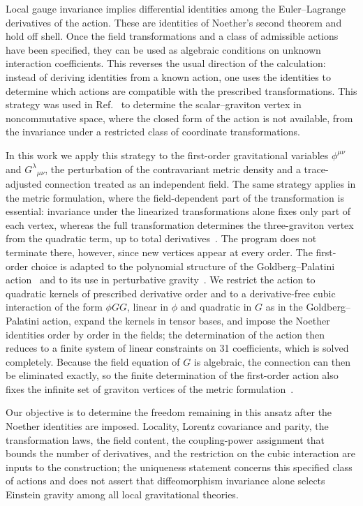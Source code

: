 \documentclass[prd,aps,preprint,nofootinbib,amsmath,amssymb,eqsecnum]{revtex4-2}
\begin{document}
Local gauge invariance implies differential identities among the Euler--Lagrange derivatives
of the action. These are identities of Noether's second theorem and hold off shell. Once the
field transformations and a class of admissible actions have been specified, they can be used
as algebraic conditions on unknown interaction coefficients. This reverses the usual direction
of the calculation: instead of deriving identities from a known action, one uses the
identities to determine which actions are compatible with the prescribed transformations.
This strategy was used in Ref.~\cite{BrandtElias2006} to determine the scalar--graviton
vertex in noncommutative space, where the closed form of the action is not available, from
the invariance under a restricted class of coordinate transformations.

In this work we apply this strategy to the first-order gravitational variables $\phi^{\mu\nu}$
and $G^{\lambda}{}_{\mu\nu}$, the perturbation of the contravariant metric density and a
trace-adjusted connection treated as an independent field. The
same strategy applies in the metric formulation, where the field-dependent part of the
transformation is essential: invariance under the linearized transformations alone fixes
only part of each vertex, whereas the full transformation determines the three-graviton
vertex from the quadratic term, up to total derivatives~\cite{BrandtFrenkel1996}. The
program does not terminate there, however, since new vertices appear at every order. The
first-order choice is adapted to the polynomial structure of the Goldberg--Palatini
action~\cite{Goldberg1958,Palatini1919,Ferraris1982} and to its use in perturbative
gravity~\cite{BrandtMcKeon2016}. We restrict the action to quadratic kernels of
prescribed derivative order and to a derivative-free cubic interaction of the form $\phi GG$, linear in $\phi$ and quadratic
in $G$ as in the Goldberg--Palatini action,
expand the kernels in tensor bases, and impose the Noether identities order by order in the
fields; the determination of the action then reduces to a finite system of linear constraints on 31
coefficients, which is solved completely. Because the field equation of $G$ is algebraic, the
connection can then be eliminated exactly, so the finite determination of the first-order
action also fixes the infinite set of graviton vertices of the metric
formulation~\cite{BrandtMcKeon2016}.

Our objective is to determine the freedom remaining in this ansatz after the Noether
identities are imposed. Locality, Lorentz covariance and parity, the transformation laws, the
field content, the coupling-power assignment that bounds the number of derivatives, and the
restriction on the cubic interaction are inputs to the construction; the
uniqueness statement concerns this specified class of actions and does not assert that
diffeomorphism invariance alone selects Einstein gravity among all local gravitational
theories.
\end{document}
